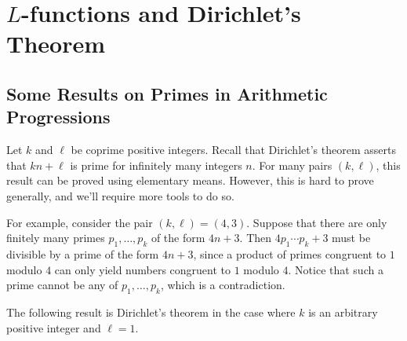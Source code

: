 \section{$L$-functions and Dirichlet's Theorem}\label{sec:7}

\subsection{Some Results on Primes in Arithmetic Progressions}\label{subsec:7.1}
Let $k$ and $\ell$ be coprime positive integers. Recall that Dirichlet's theorem 
asserts that $kn + \ell$ is prime for infinitely many integers $n$. For many 
pairs $(k, \ell)$, this result can be proved using elementary means. However, 
this is hard to prove generally, and we'll require more tools to do so. 

For example, consider the pair $(k, \ell) = (4, 3)$. Suppose that there are only 
finitely many primes $p_1, \dots, p_k$ of the form $4n + 3$. Then $4p_1 
\cdots p_k + 3$ must be divisible by a prime of the form $4n + 3$, since a product 
of primes congruent to $1$ modulo $4$ can only yield numbers congruent to 
$1$ modulo $4$. Notice that such a prime cannot be any of $p_1, \dots, p_k$, 
which is a contradiction. 

The following result is Dirichlet's theorem in the case where $k$ is an 
arbitrary positive integer and $\ell = 1$. 

